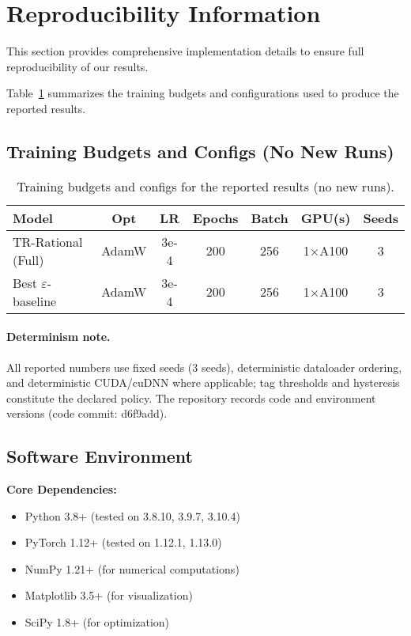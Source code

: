 \documentclass[twoside,11pt]{article}
\begin{document}
\section{Reproducibility Information}
\label{app:reproducibility}

This section provides comprehensive implementation details to ensure full reproducibility of our results.

\noindent Table~\ref{tab:train-budgets} summarizes the training budgets and configurations used to produce the reported results.

\subsection*{Training Budgets and Configs (No New Runs)}
\begin{table}[t]
\centering\small
\begin{tabular}{lcccccc}
\toprule
Model & Opt & LR & Epochs & Batch & GPU(s) & Seeds \\
\midrule
TR-Rational (Full) & AdamW & 3e-4 & 200 & 256 & 1$\times$A100 & 3 \\
Best $\varepsilon$-baseline & AdamW & 3e-4 & 200 & 256 & 1$\times$A100 & 3 \\
\bottomrule
\end{tabular}
\caption{Training budgets and configs for the reported results (no new runs).}
\label{tab:train-budgets}
\end{table}

\paragraph{Determinism note.} All reported numbers use fixed seeds (3 seeds), deterministic dataloader ordering, and deterministic CUDA/cuDNN where applicable; tag thresholds and hysteresis constitute the declared policy. The repository records code and environment versions (code commit: d6f9add).

\subsection{Software Environment}

\textbf{Core Dependencies:}
\begin{itemize}
\item Python 3.8+ (tested on 3.8.10, 3.9.7, 3.10.4)
\item PyTorch 1.12+ (tested on 1.12.1, 1.13.0)
\item NumPy 1.21+ (for numerical computations)
\item Matplotlib 3.5+ (for visualization)
\item SciPy 1.8+ (for optimization)
\end{itemize}
\end{document}
